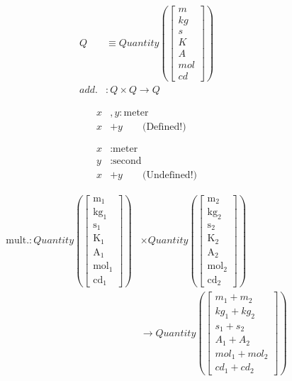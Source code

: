 \documentclass{beamer}
\begin{document}
\begin{frame}[fragile]
  \begin{align*}
    Q & \equiv Quantity\left( \begin{bmatrix*}m \\ kg \\ s \\ K \\ A \\ mol \\ cd \end{bmatrix*} \right) \\
    add. & : Q \times Q \to Q 
  \end{align*}
\end{frame}

\begin{frame}[fragile]
  \begin{align*}
    x &, y : \text{meter} \\
    x & + y \qquad \text{(Defined!)} \\ \\ \\
    x & : \text{meter} \\
    y & : \text{second} \\
    x & + y \qquad \text{(Undefined!)}
  \end{align*}
\end{frame}

\begin{frame}[fragile]
  \begin{align*}
    \text{mult.} : Quantity\left( \begin{bmatrix*}\text{m}_1 \\ \text{kg}_1 \\ \text{s}_1 \\ \text{K}_1 \\ \text{A}_1 \\ \text{mol}_1 \\ \text{cd}_1\end{bmatrix*} \right) & \times Quantity\left( \begin{bmatrix*}\text{m}_2 \\ \text{kg}_2 \\ \text{s}_2 \\ \text{K}_2 \\ \text{A}_2 \\ \text{mol}_2 \\ \text{cd}_2\end{bmatrix*} \right) \\
       & \to Quantity\left( \begin{bmatrix*}m_1 + m_2 \\ kg_1 + kg_2 \\ s_1 + s_2 \\ A_1 + A_2 \\ mol_1 + mol_2 \\ cd_1 + cd_2\end{bmatrix*} \right)
  \end{align*}
\end{frame}
\end{document}
